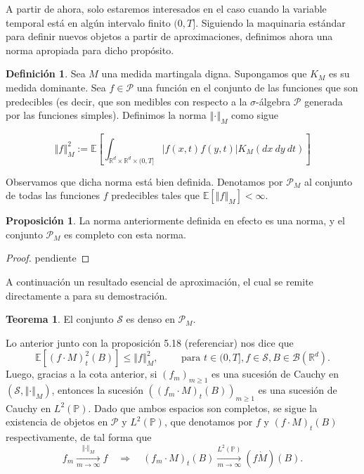 \documentclass[letterpaper,twoside,12pt]{book}
\newcommand{\R}{\mathbb{R}}
\newcommand{\B}{\mathcal{B}}
\newcommand{\E}{\mathbb{E}}
\renewcommand{\P}{\mathbb{P}}
\newcommand{\1}{\mathds{1}}
\newcommand{\abs}[1]{\left\lvert #1 \right\rvert}
\renewcommand{\to}{\rightarrow}
\newcommand{\ent}{\Longrightarrow}
\newcommand{\norm}[1]{\left\Vert #1 \right\Vert}
\theoremstyle{definition}
\newtheorem{dfn}{Definición}
\theoremstyle{definition}
\newtheorem{teo}{Teorema}
\theoremstyle{definition}
\theoremstyle{definition}
\newtheorem{prop}{Proposición}
\theoremstyle{definition}
\theoremstyle{definition}
\theoremstyle{definition}
\begin{document}
A partir de ahora, solo estaremos interesados en el caso cuando la variable temporal está en algún intervalo finito $(0,T]$. Siguiendo la maquinaria estándar para definir nuevos objetos a partir de aproximaciones, definimos ahora una norma apropiada para dicho propósito.

\begin{dfn} 
 Sea $M$ una medida martingala digna. Supongamos que $K_M$ es su medida dominante. Sea $f\in \mathscr{P}$ una función en el conjunto de las funciones que son predecibles (es decir, que son medibles con respecto a la $\sigma$-álgebra $\mathscr{P}$ generada por las funciones simples). Definimos la norma $\norm{\cdot}_M$ como sigue 
 
 \end{dfn}
\[
    \norm{f}_M^2:=\E\left[\int_{\R^{d}\times\R^{d}\times (0,T]} \abs{f(x,t)f(y,t)}K_M(dx \ dy \ dt)\right]
\]

Observamos que dicha norma está bien definida. Denotamos por $\mathscr{P}_M$ al conjunto de todas las funciones $f$ predecibles tales que $\E\left[\norm{f}_M\right]<\infty$.

\begin{prop} 
 La norma anteriormente definida en efecto es una norma, y el conjunto $\mathscr{P}_M$ es completo con esta norma.
 \end{prop}
 \begin{proof} 
   pendiente 
  \end{proof}
 A continuación un resultado esencial de aproximación, el cual se remite directamente a \cite{Walsh_J.B_Introduction_to_SPDEs} para su demostración.

\begin{teo} 
 El conjunto $\mathscr{S}$ es denso en $\mathscr{P}_M$.
 \end{teo}
 Lo anterior junto con la proposición 5.18 (referenciar) nos dice que 
 \[
 \E\left[(f\cdot M)_t^{2}(B)\right]\leq \norm{f}_M^2,\qquad \text{ para } t\in (0,T], f\in \mathscr{S}, B\in \B(\R^d).
 \]
 Luego, gracias a la cota anterior, si $(f_m)_{m\geq1}$ es una sucesión de Cauchy en $(\mathscr{S},\norm{\cdot}_M)$, entonces la sucesión $\left((f_m\cdot M)_t(B)\right)_{m\geq1}$ es una sucesión de Cauchy en $L^{2}(\P)$. Dado que ambos espacios son completos, se sigue la existencia de objetos en $\mathscr{P}$ y $L^{2}(\P)$, que denotamos por $f$ y $(f\cdot M)_t(B)$ respectivamente, de tal forma que 
 \[
 f_m\xrightarrow[m\to\infty]{\norm{\cdot}_M}f \quad \ent \quad (f_m\cdot M)_t(B) \xrightarrow[m\to\infty]{L^{2}(\P)} (f\dot M)(B).   
 \]
\end{document}
